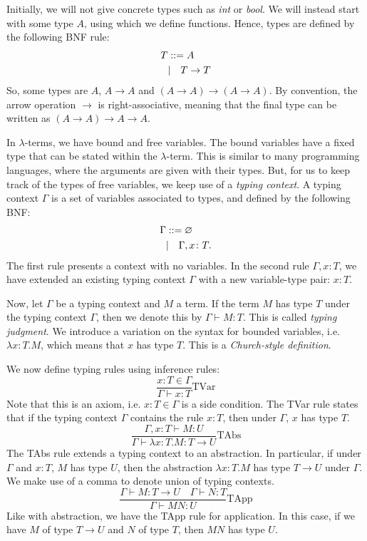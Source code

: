 \documentclass[a4paper, openany]{memoir}
\theoremstyle{definition}
\begin{document}
    Initially, we will not give concrete types such as \textit{int} or \textit{bool}. We will instead start with some type $A$, using which we define functions. Hence, types are defined by the following BNF rule:
    \begin{align*}
        T &::= A \\
        &| \hspace*{10pt} T \to T
    \end{align*}
    So, some types are $A$, $A \to A$ and $(A \to A) \to (A \to A)$. By convention, the arrow operation $\to$ is right-associative, meaning that the final type can be written as $(A \to A) \to A \to A$.

    In $\lambda$-terms, we have bound and free variables. The bound variables have a fixed type that can be stated within the $\lambda$-term. This is similar to many programming languages, where the arguments are given with their types. But, for us to keep track of the types of free variables, we keep use of a \emph{typing context}. A typing context $\Gamma$ is a set of variables associated to types, and defined by the following BNF:
    \begin{align*}
        \Gamma &::= \varnothing \\
        &| \hspace*{10pt} \Gamma, x \colon T.
    \end{align*}
    The first rule presents a context with no variables. In the second rule $\Gamma, x \colon T$, we have extended an existing typing context $\Gamma$ with a new variable-type pair: $x \colon T$.

    Now, let $\Gamma$ be a typing context and $M$ a term. If the term $M$ has type $T$ under the typing context $\Gamma$, then we denote this by $\Gamma \vdash M \colon T$. This is called \emph{typing judgment}. We introduce a variation on the syntax for bounded variables, i.e. $\lambda x \colon T.M$, which means that $x$ has type $T$. This is a \emph{Church-style definition}.

    We now define typing rules using inference rules:
    \[\frac{x \colon T \in \Gamma}{\Gamma \vdash x \colon T}\textrm{TVar} \] 
    Note that this is an axiom, i.e. $x \colon T \in \Gamma$ is a side condition. The TVar rule states that if the typing context $\Gamma$ contains the rule $x \colon T$, then under $\Gamma$, $x$ has type $T$. 
    \[\frac{\Gamma, x \colon T \vdash M \colon U}{\Gamma \vdash \lambda x \colon T.M \colon T \to U} \textrm{TAbs}\]
    The TAbs rule extends a typing context to an abstraction. In particular, if under $\Gamma$ and $x \colon T$, $M$ has type $U$, then the abstraction $\lambda x \colon T. M$ has type $T \to U$ under $\Gamma$. We make use of a comma to denote union of typing contexts.    
    \[\frac{\Gamma \vdash M \colon T \to U \quad \Gamma \vdash N \colon T}{\Gamma \vdash MN \colon U} \textrm{TApp}\]
    Like with abstraction, we have the TApp rule for application. In this case, if we have $M$ of type $T \to U$ and $N$ of type $T$, then $MN$ has type $U$.
\end{document}
